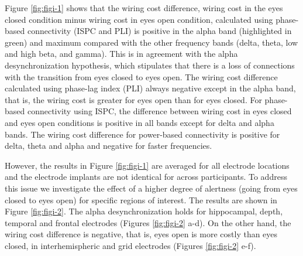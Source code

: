\documentclass[11pt, onecolumn]{article}
\begin{document}
{Figure \ref{fig:figi-1} shows that the wiring cost difference, wiring cost in the eyes closed condition minus wiring cost in eyes open condition, calculated using phase-based connectivity (ISPC and PLI) is positive in the alpha band (highlighted in green) and maximum compared with the other frequency bands (delta, theta, low and high beta, and gamma). This is in agreement with the alpha desynchronization hypothesis, which stipulates that there is a loss of connections with the transition from eyes closed to eyes open. 
The wiring cost difference calculated  using phase-lag index (PLI) always  negative  except in the alpha band, that is, the wiring cost is greater  for eyes open than  for eyes closed. For  phase-based  connectivity using  ISPC, the  difference between wiring cost in eyes closed and eyes open conditions is positive  in all bands except for delta  and  alpha bands.  The wiring cost difference for power-based connectivity is positive  for  delta, theta and alpha and negative for faster frequencies.     

However, the results in Figure \ref{fig:figi-1} are averaged for all electrode locations and the electrode implants are not identical for across participants. 
To address this issue we investigate the effect of a higher degree of alertness (going from eyes closed to eyes open) for specific regions of interest. The results are shown in Figure \ref{fig:figi-2}.
The alpha desynchronization holds for hippocampal, depth, temporal and frontal electrodes (Figures \ref{fig:figi-2} a-d). On the other hand, the wiring cost difference is negative, that is, eyes open is more costly than eyes closed, in interhemispheric and grid electrodes (Figures \ref{fig:figi-2} e-f).


}
\end{document}
